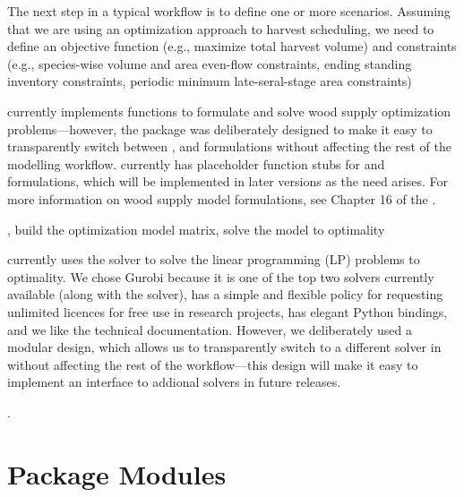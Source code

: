 \documentclass[letterpaper,10pt,english]{sphinxmanual}
\begin{document}
The next step in a typical workflow is to define one or more scenarios. Assuming that we are using an optimization approach to harvest scheduling, we need to define an objective function (e.g., maximize total harvest volume) and constraints (e.g., species-wise volume and area even-flow constraints, ending standing inventory constraints, periodic minimum late-seral-stage area constraints) %
\begin{footnote}[2]\sphinxAtStartFootnote
{} currently implements functions to formulate and solve  wood supply optimization problems—however, the package was deliberately designed to make it easy to transparently switch between ,   and  formulations without affecting the rest of the modelling workflow.  currently has placeholder function stubs for  and  formulations, which will be implemented in later versions as the need arises. For more information on wood supply model formulations, see Chapter 16 of the .
%
\end{footnote}, build the optimization model matrix, solve the model to optimality %
\begin{footnote}[3]\sphinxAtStartFootnote
{} currently uses the  solver to solve the linear programming (LP) problems to optimality. We chose Gurobi because it is one of the top two solvers currently available (along with the  solver), has a simple and flexible policy for requesting unlimited licences for free use in research projects, has elegant Python bindings, and we like the technical documentation. However, we deliberately used a modular design, which allows us to transparently switch to a different solver in  without affecting the rest of the workflow—this design will make it easy to implement an interface to addional solvers in future releases.
%
\end{footnote}.


\chapter{ Package Modules}
\label{\detokenize{modules::doc}}\label{\detokenize{modules:ws3-package-modules}}
\end{document}
